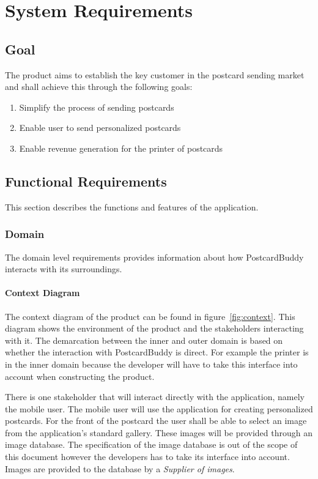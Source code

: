 \documentclass[10pt,a4paper]{article}
\begin{document}
\section{System Requirements}

\subsection{Goal}
The product aims to establish the key customer in the postcard sending market and shall achieve this through the following goals:

\begin{enumerate}
\item Simplify the process of sending postcards \label{goal:simpl}
\item Enable user to send personalized postcards \label{goal:pers}
\item Enable revenue generation for the printer of postcards \label{goal:rev}
\end{enumerate}

\subsection{Functional Requirements}
This section describes the functions and features of the application.

\subsubsection{Domain}
The domain level requirements provides information about how PostcardBuddy interacts with its surroundings. 

\paragraph{Context Diagram}
The context diagram of the product can be found in figure~\ref{fig:context}. This diagram shows the environment of the product and the stakeholders interacting with it. The demarcation between the inner and outer domain is based on whether the interaction with PostcardBuddy is direct. For example the printer is in the inner domain because the developer will have to take this interface into account when constructing the product. 

There is one stakeholder that will interact directly with the application, namely the mobile user. The mobile user will use the application for creating personalized postcards. For the front of the postcard the user shall be able to select an image from the application's standard gallery. These images will be provided through an image database. The specification of the image database is out of the scope of this document however the developers has to take its interface into account. Images are provided to the database by a \textit{Supplier of images}.
\end{document}
